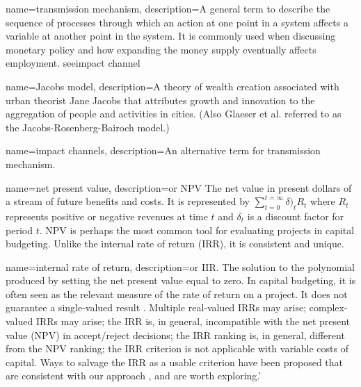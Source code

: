 {
name=transmission mechanism,
description={A general term to describe the sequence of processes through which an action at one point in a system affects a variable at another point in the system. It is commonly used when discussing monetary policy and how expanding the money supply eventually affects employment. see\gls{impact channel}}
}


{
name=Jacobs model,
description={A theory of wealth creation associated with urban theorist Jane Jacobs that attributes growth and innovation to the aggregation of people and activities in cities. (Also Glaeser et al. \cite{glaeserGrowthCities1991} referred to as the Jacobs-Rosenberg-Bairoch model.) } 
}

{
name=impact channels,
description={An alternative term for \gls{transmission mechanism}.}
}

{
name=net present value,
description={or NPV The net value in present dollars of a stream of future benefits and costs. It is represented by $\sum_{t=0} ^{t=\infty} \delta)_t R_t$ where $R_t$ represents positive or negative revenues at time $t$ and $\delta_t$ is a \gls{discount factor} for period $t$. NPV is perhaps the most common tool for evaluating projects in capital budgeting. Unlike the \gls{internal rate of return} (IRR), it is consistent and unique.}
}

{
name=internal rate of return,
description={or IIR. The solution to the polynomial produced by setting the \gls{net present value} equal to zero. In capital budgeting, it is often seen as the relevant measure of the rate of return on a project. It does not guarantee a single-valued result \cite{robinsonOptimalTerminationIRR1996}. Multiple real-valued  IRRs may arise;  complex-valued IRRs may arise;  the IRR is, in general, incompatible with the net present value (NPV) in accept/reject decisions; the IRR ranking is, in general, different from the NPV ranking; the IRR criterion is not applicable with variable costs of capital. Ways to salvage the IRR as a usable criterion have been proposed that are consistent with our approach \cite{magniAverageInternalRate2010}, and are worth exploring.'}
}

